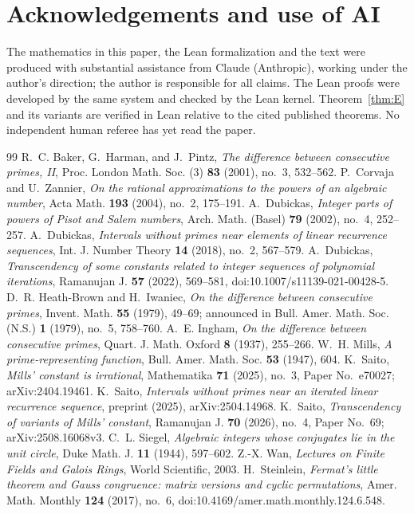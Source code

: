 \documentclass[11pt]{amsart}
\theoremstyle{definition}
\begin{document}
\section*{Acknowledgements and use of AI}
The mathematics in this paper, the Lean formalization and the text were produced with substantial assistance from Claude (Anthropic), working under the author's direction; the author is responsible for all claims.  The Lean proofs were developed by the same system and checked by the Lean kernel.  Theorem~\ref{thm:E} and its variants are verified in Lean relative to the cited published theorems.  No independent human referee has yet read the paper.

\begin{thebibliography}{99}
 R.~C. Baker, G.~Harman, and J.~Pintz, \emph{The difference between consecutive primes, II}, Proc. London Math. Soc. (3) \textbf{83} (2001), no.~3, 532--562.
 P.~Corvaja and U.~Zannier, \emph{On the rational approximations to the powers of an algebraic number}, Acta Math. \textbf{193} (2004), no.~2, 175--191.
 A.~Dubickas, \emph{Integer parts of powers of Pisot and Salem numbers}, Arch. Math. (Basel) \textbf{79} (2002), no.~4, 252--257.
 A.~Dubickas, \emph{Intervals without primes near elements of linear recurrence sequences}, Int. J. Number Theory \textbf{14} (2018), no.~2, 567--579.
 A.~Dubickas, \emph{Transcendency of some constants related to integer sequences of polynomial iterations}, Ramanujan J. \textbf{57} (2022), 569--581, doi:10.1007/s11139-021-00428-5.
 D.~R. Heath-Brown and H.~Iwaniec, \emph{On the difference between consecutive primes}, Invent. Math. \textbf{55} (1979), 49--69; announced in Bull. Amer. Math. Soc. (N.S.) \textbf{1} (1979), no.~5, 758--760.
 A.~E. Ingham, \emph{On the difference between consecutive primes}, Quart. J. Math. Oxford \textbf{8} (1937), 255--266.
 W.~H. Mills, \emph{A prime-representing function}, Bull. Amer. Math. Soc. \textbf{53} (1947), 604.
 K.~Saito, \emph{Mills' constant is irrational}, Mathematika \textbf{71} (2025), no.~3, Paper No.~e70027; arXiv:2404.19461.
 K.~Saito, \emph{Intervals without primes near an iterated linear recurrence sequence}, preprint (2025), arXiv:2504.14968.
 K.~Saito, \emph{Transcendency of variants of Mills' constant}, Ramanujan J. \textbf{70} (2026), no.~4, Paper No.~69; arXiv:2508.16068v3.
 C.~L. Siegel, \emph{Algebraic integers whose conjugates lie in the unit circle}, Duke Math. J. \textbf{11} (1944), 597--602.
 Z.-X. Wan, \emph{Lectures on Finite Fields and Galois Rings}, World Scientific, 2003.
 H.~Steinlein, \emph{Fermat's little theorem and Gauss congruence: matrix versions and cyclic permutations}, Amer. Math. Monthly \textbf{124} (2017), no.~6, doi:10.4169/amer.math.monthly.124.6.548.
\end{thebibliography}
\end{document}
